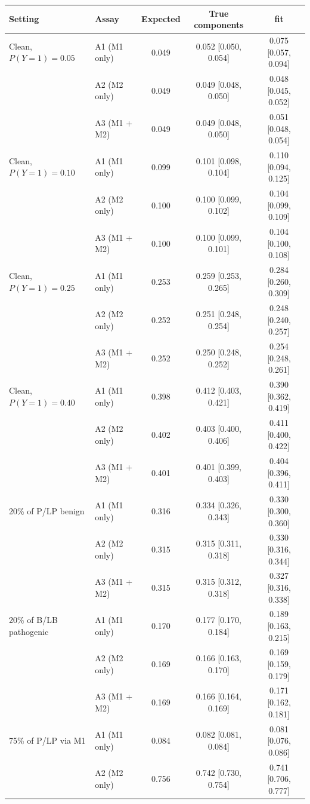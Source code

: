 \begin{tabular}{llccc}
\toprule
Setting & Assay & Expected & True components & \excalibr{} fit \\
\midrule
Clean, $P(Y=1) = 0.05$ & A1 (M1 only) & 0.049 & 0.052 [0.050, 0.054] & 0.075 [0.057, 0.094] \\
 & A2 (M2 only) & 0.049 & 0.049 [0.048, 0.050] & 0.048 [0.045, 0.052] \\
 & A3 (M1 + M2) & 0.049 & 0.049 [0.048, 0.050] & 0.051 [0.048, 0.054] \\
\midrule
Clean, $P(Y=1) = 0.10$ & A1 (M1 only) & 0.099 & 0.101 [0.098, 0.104] & 0.110 [0.094, 0.125] \\
 & A2 (M2 only) & 0.100 & 0.100 [0.099, 0.102] & 0.104 [0.099, 0.109] \\
 & A3 (M1 + M2) & 0.100 & 0.100 [0.099, 0.101] & 0.104 [0.100, 0.108] \\
\midrule
Clean, $P(Y=1) = 0.25$ & A1 (M1 only) & 0.253 & 0.259 [0.253, 0.265] & 0.284 [0.260, 0.309] \\
 & A2 (M2 only) & 0.252 & 0.251 [0.248, 0.254] & 0.248 [0.240, 0.257] \\
 & A3 (M1 + M2) & 0.252 & 0.250 [0.248, 0.252] & 0.254 [0.248, 0.261] \\
\midrule
Clean, $P(Y=1) = 0.40$ & A1 (M1 only) & 0.398 & 0.412 [0.403, 0.421] & 0.390 [0.362, 0.419] \\
 & A2 (M2 only) & 0.402 & 0.403 [0.400, 0.406] & 0.411 [0.400, 0.422] \\
 & A3 (M1 + M2) & 0.401 & 0.401 [0.399, 0.403] & 0.404 [0.396, 0.411] \\
\midrule
20\% of P/LP benign & A1 (M1 only) & 0.316 & 0.334 [0.326, 0.343] & 0.330 [0.300, 0.360] \\
 & A2 (M2 only) & 0.315 & 0.315 [0.311, 0.318] & 0.330 [0.316, 0.344] \\
 & A3 (M1 + M2) & 0.315 & 0.315 [0.312, 0.318] & 0.327 [0.316, 0.338] \\
\midrule
20\% of B/LB pathogenic & A1 (M1 only) & 0.170 & 0.177 [0.170, 0.184] & 0.189 [0.163, 0.215] \\
 & A2 (M2 only) & 0.169 & 0.166 [0.163, 0.170] & 0.169 [0.159, 0.179] \\
 & A3 (M1 + M2) & 0.169 & 0.166 [0.164, 0.169] & 0.171 [0.162, 0.181] \\
\midrule
75\% of P/LP via M1 & A1 (M1 only) & 0.084 & 0.082 [0.081, 0.084] & 0.081 [0.076, 0.086] \\
 & A2 (M2 only) & 0.756 & 0.742 [0.730, 0.754] & 0.741 [0.706, 0.777] \\

\end{tabular}
